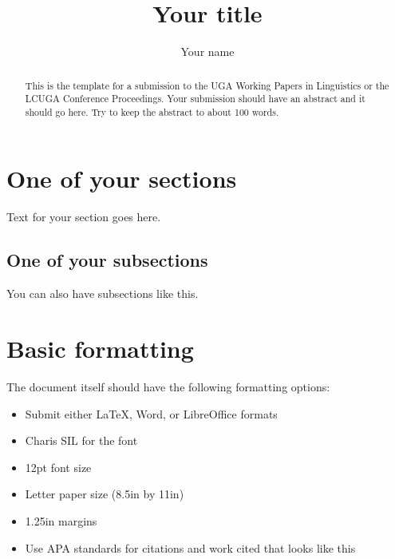 



\title{Your title}
\author{Your name}


  \maketitle
  \showextra %
  \thispagestyle{empty} %

  \begin{abstract}
    This is the template for a submission to the UGA Working Papers in Linguistics or the LCUGA Conference Proceedings.
    Your submission should have an abstract and it should go here.
    Try to keep the abstract to about 100 words.
  \end{abstract}

  \section{One of your sections}
    Text for your section goes here.
    \subsection{One of your subsections}
      You can also have subsections like this.

  \section{Basic formatting}
    The document itself should have the following formatting options:
    \begin{itemize}
      \item Submit either LaTeX, Word, or LibreOffice formats
      \item Charis SIL for the font
      \item 12pt font size
      \item Letter paper size (8.5in by 11in)
      \item 1.25in margins
      \item Use APA standards for citations and work cited that looks like this \parencite[p.~100]{gudmestad_variationist_2022}
    \end{itemize}

